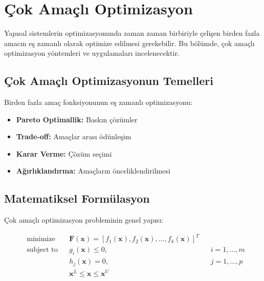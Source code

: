 \section{Çok Amaçlı Optimizasyon}
Yapısal sistemlerin optimizasyonunda zaman zaman birbiriyle çelişen birden fazla amacın eş zamanlı olarak optimize edilmesi gerekebilir. Bu bölümde, çok amaçlı optimizasyon yöntemleri ve uygulamaları incelenecektir. 

\subsection{Çok Amaçlı Optimizasyonun Temelleri}
Birden fazla amaç fonksiyonunun eş zamanlı optimizasyonu:

\begin{tcolorbox}[title=Temel Kavramlar]
\begin{itemize}
    \item \textbf{Pareto Optimallik:} Baskın çözümler
    \item \textbf{Trade-off:} Amaçlar arası ödünleşim
    \item \textbf{Karar Verme:} Çözüm seçimi
    \item \textbf{Ağırlıklandırma:} Amaçların önceliklendirilmesi
\end{itemize}
\end{tcolorbox}

\subsection{Matematiksel Formülasyon}
Çok amaçlı optimizasyon probleminin genel yapısı:

\begin{equation}
\begin{aligned}
& \text{minimize} & & \mathbf{F}(\mathbf{x}) = [f_1(\mathbf{x}), f_2(\mathbf{x}), \ldots, f_k(\mathbf{x})]^T \\
& \text{subject to} & & g_i(\mathbf{x}) \leq 0, & & i = 1,\ldots,m \\
& & & h_j(\mathbf{x}) = 0, & & j = 1,\ldots,p \\
& & & \mathbf{x}^L \leq \mathbf{x} \leq \mathbf{x}^U
\end{aligned}
\end{equation}




